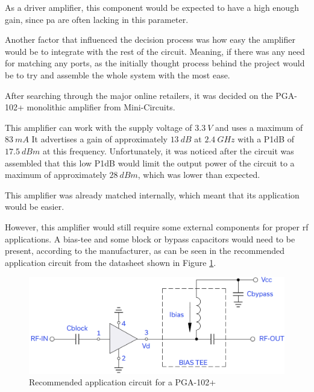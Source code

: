 \par As a driver amplifier, this component would be expected to have a high enough gain, since \ac{pa} are often lacking in this parameter.

\par Another factor that influenced the decision process was how easy the amplifier would be to integrate with the rest of the circuit. Meaning, if there was any need for matching any ports, as the initially thought process behind the project would be to try and assemble the whole system with the most ease.

\par After searching through the major online retailers, it was decided on the PGA-102+ monolithic amplifier from Mini-Circuits. 

\par This amplifier can work with the supply voltage of $3.3 \:\si{V}$ and uses a maximum of $83 \:\si{mA}$ It advertises a gain of approximately $13 \:\si{dB}$ at $2.4 \:\si{GHz}$ with a P1dB of $17.5 \:\si{dBm}$ at this frequency. Unfortunately, it was noticed after the circuit was assembled that this low P1dB would limit the output power of the circuit to a maximum of approximately $28 \:\si{dBm}$, which was lower than expected.

\par This amplifier was already matched internally, which meant that its application would be easier. 

\par However, this amplifier would still require some external components for proper \ac{rf} applications. A bias-tee and some block or bypass capacitors would need to be present, according to the manufacturer, as can be seen in the recommended application circuit from the datasheet shown in Figure \ref{fig:ch3_pga102+application.png}. 

\begin{figure}[H]
    \vspace*{0cm}
    \centering
    \includegraphics[width=0.7\linewidth]{figs/ch3_pga102+application.png}
    \caption{Recommended application circuit for a PGA-102+ \cite{MonolithicPGA-102+}}
    \label{fig:ch3_pga102+application.png}
\end{figure}

